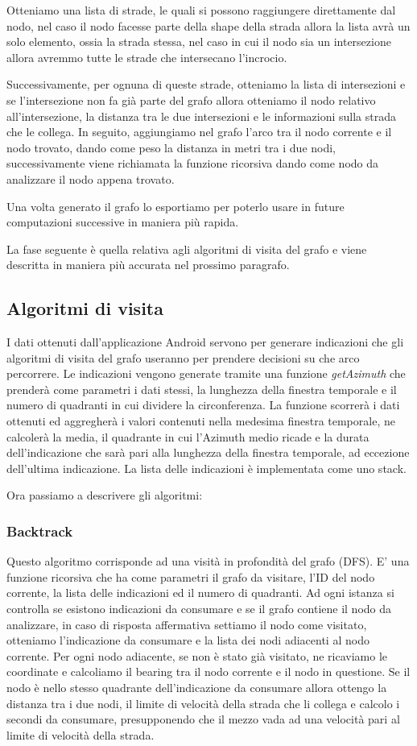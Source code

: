 \documentclass[12pt,a4paper,openright,twoside]{report}
\begin{document}
Otteniamo una lista di strade, le quali si possono raggiungere direttamente dal nodo, nel caso il nodo facesse parte della shape della strada allora la lista avrà un solo elemento, ossia la strada stessa, nel caso in cui il nodo sia un intersezione allora avremmo tutte le strade che intersecano l'incrocio.

Successivamente, per ognuna di queste strade, otteniamo la lista di intersezioni e se l'intersezione non fa già parte del grafo allora otteniamo il nodo relativo all'intersezione, la distanza tra le due intersezioni e le informazioni sulla strada che le collega. In seguito, aggiungiamo nel grafo l'arco tra il nodo corrente e il nodo trovato, dando come peso la distanza in metri tra i due nodi, successivamente viene richiamata la funzione ricorsiva dando come nodo da analizzare il nodo appena trovato.

Una volta generato il grafo lo esportiamo per poterlo usare in future computazioni successive in maniera più rapida.

La fase seguente è quella relativa agli algoritmi di visita del grafo e viene descritta in maniera più accurata nel prossimo paragrafo.
\newpage
\subsection{Algoritmi di visita}
I dati ottenuti dall'applicazione Android servono per generare indicazioni che gli algoritmi di visita del grafo useranno per prendere decisioni su che arco percorrere.
Le indicazioni vengono generate tramite una funzione \textit{getAzimuth} che prenderà come parametri i dati stessi, la lunghezza della finestra temporale e il numero di quadranti in cui dividere la circonferenza. La funzione scorrerà i dati ottenuti ed aggregherà i valori contenuti nella medesima finestra temporale, ne calcolerà la media, il quadrante in cui l'Azimuth medio ricade e la durata dell'indicazione che sarà pari alla lunghezza della finestra temporale, ad eccezione dell'ultima indicazione.
La lista delle indicazioni è implementata come uno stack.

Ora passiamo a descrivere gli algoritmi:

\subsubsection{Backtrack}
Questo algoritmo corrisponde ad una visità in profondità del grafo (DFS). E' una funzione ricorsiva che ha come parametri il grafo da visitare, l'ID del nodo corrente, la lista delle indicazioni ed il numero di quadranti. Ad ogni istanza si controlla se esistono indicazioni da consumare e se il grafo contiene il nodo da analizzare, in caso di risposta affermativa settiamo il nodo come visitato, otteniamo l'indicazione da consumare e la lista dei nodi adiacenti al nodo corrente. Per ogni nodo adiacente, se non è stato già visitato, ne ricaviamo le coordinate e calcoliamo il bearing tra il nodo corrente e il nodo in questione. Se il nodo è nello stesso quadrante dell'indicazione da consumare allora ottengo la distanza tra i due nodi, il limite di velocità della strada che li collega e calcolo i secondi da consumare, presupponendo che il mezzo vada ad una velocità pari al limite di velocità della strada. 
\end{document}
